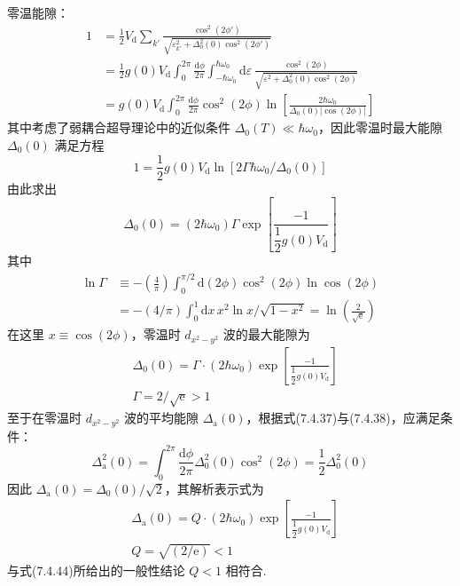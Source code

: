 零温能隙：
\begin{equation*}
\begin{aligned}
  1&=\frac{1}{2}V_{\mathrm{d}}\sum_{k'}
  \frac{\cos^{2}(2\phi')}{\sqrt{\varepsilon_{k'}^{2}+\Delta_{0}^{2}(0)\cos^{2}(2\phi')}}\\
  &=\frac{1}{2}g(0)V_{\mathrm{d}}\int_{0}^{2\pi}\frac{\mathrm{d}\phi}{2\pi}
  \int_{-\hbar\omega_{0}}^{\hbar\omega_{0}}\mathrm{d}\varepsilon\,
  \frac{\cos^{2}(2\phi)}{\sqrt{\varepsilon^{2}+\Delta_{0}^{2}(0)\cos^{2}(2\phi)}}\\
  &=g(0)V_{\mathrm{d}}\int_{0}^{2\pi}\frac{\mathrm{d}\phi}{2\pi}\cos^{2}(2\phi)
  \ln\left[\frac{2\hbar\omega_{0}}{\Delta_{0}(0)\left|\cos(2\phi)\right|}\right]
\end{aligned}
\end{equation*}
其中考虑了弱耦合超导理论中的近似条件 $\Delta_{0}(T)\ll\hbar\omega_{0}$，因此零温时最大能隙 $\Delta_{0}(0)$ 满足方程
\begin{equation*}
  1=\frac{1}{2}g(0)V_{\mathrm{d}}\ln\left[2\Gamma\hbar\omega_{0}/\Delta_{0}(0)\right]
\end{equation*}
由此求出
\begin{equation*}
  \Delta_{0}(0)=\left(2\hbar\omega_{0}\right)\Gamma\exp\left[\frac{-1}{\dfrac{1}{2}g(0)V_{\mathrm{d}}}\right]
\end{equation*}
其中
\begin{equation*}
\begin{aligned}
  \ln\Gamma&\equiv-\left(\frac{4}{\pi}\right)\int_{0}^{\pi/2}\mathrm{d}\left(2\phi\right)\cos^{2}(2\phi)\ln\cos(2\phi)\\
  &=-\left(4/\pi\right)\int_{0}^{1}\mathrm{d}x\,x^{2}\ln x/\sqrt{1-x^{2}}=\ln\left(\frac{2}{\sqrt{\mathrm{e}}}\right)
\end{aligned}
\end{equation*}
在这里 $x\equiv\cos(2\phi)$，零温时 $d_{x^{2}-y^{2}}$ 波的最大能隙为
\begin{equation}
\begin{aligned}
  &\Delta_{0}(0)=\Gamma\cdot\left(2\hbar\omega_{0}\right)\exp\left[\frac{-1}{\dfrac{1}{2}g(0)V_{\mathrm{d}}}\right]\\
  &\Gamma=2/\sqrt{\mathrm{e}}>1
\end{aligned}
\end{equation}
至于在零温时 $d_{x^{2}-y^{2}}$ 波的平均能隙 $\Delta_{\mathrm{a}}(0)$，根据式(7.4.37)与(7.4.38)，应满足条件：
\begin{equation}
  \Delta_{\mathrm{a}}^{2}(0)=\int_{0}^{2\pi}\frac{\mathrm{d}\phi}{2\pi}\Delta_{0}^{2}(0)\cos^{2}(2\phi)
  =\frac{1}{2}\Delta_{0}^{2}(0)
\end{equation}
因此 $\Delta_{\mathrm{a}}(0)=\Delta_{0}(0)/\sqrt{2}$，其解析表示式为
\begin{equation}
\begin{aligned}
  &\Delta_{\mathrm{a}}(0)=Q\cdot\left(2\hbar\omega_{0}\right)\exp\left[\frac{-1}{\dfrac{1}{2}g(0)V_{\mathrm{d}}}\right]\\
  &Q=\sqrt{\left(2/\mathrm{e}\right)}<1
\end{aligned}
\end{equation}
与式(7.4.44)所给出的一般性结论 $Q<1$ 相符合.

